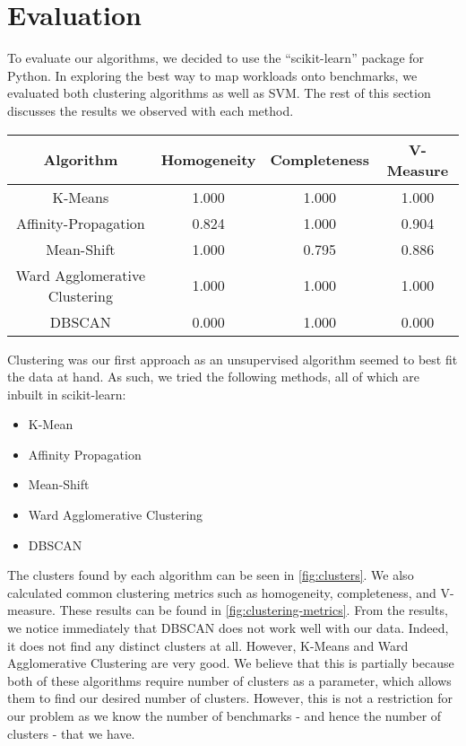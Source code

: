 \section{Evaluation} \label{sec:eval}

To evaluate our algorithms, we decided to use the ``scikit-learn''
\citep{scikit-learn} package for Python. In exploring the best way to
map workloads onto benchmarks, we evaluated both clustering algorithms
as well as SVM. The rest of this section discusses the results we
observed with each method.

\begin{figure*}[h]
    \centering
    \begin{tabular}{c c c c}
      \toprule
      Algorithm                     & Homogeneity & Completeness & V-Measure \\
      \midrule
      K-Means                       & 1.000       & 1.000        & 1.000     \\
      Affinity-Propagation          & 0.824       & 1.000        & 0.904     \\
      Mean-Shift                    & 1.000       & 0.795        & 0.886     \\
      Ward Agglomerative Clustering & 1.000       & 1.000        & 1.000     \\
      DBSCAN                        & 0.000       & 1.000        & 0.000     \\
      \bottomrule
    \end{tabular}

    \caption{Clustering Algorithm Performance Metrics}
    \label{fig:clustering-metrics}
\end{figure*}

Clustering was our first approach as an unsupervised algorithm seemed
to best fit the data at hand. As such, we tried the following methods,
all of which are inbuilt in scikit-learn:

\begin{itemize}
\item K-Mean
\item Affinity Propagation
\item Mean-Shift
\item Ward Agglomerative Clustering
\item DBSCAN
\end{itemize}

The clusters found by each algorithm can be seen in
\ref{fig:clusters}. We also calculated common clustering metrics such
as homogeneity, completeness, and V-measure. These results can be
found in \ref{fig:clustering-metrics}. From the results, we notice
immediately that DBSCAN does not work well with our data. Indeed, it
does not find any distinct clusters at all. However, K-Means and Ward
Agglomerative Clustering are very good. We believe that this is
partially because both of these algorithms require number of clusters
as a parameter, which allows them to find our desired number of
clusters. However, this is not a restriction for our problem as we
know the number of benchmarks - and hence the number of clusters -
that we have.

